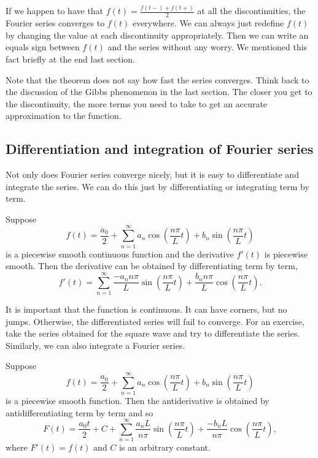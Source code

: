 If we happen to have that
$f(t) = \frac{f(t-)+f(t+)}{2}$ at all the discontinuities, the Fourier series
converges to $f(t)$ everywhere.  We can always just redefine $f(t)$
by changing the value at each discontinuity appropriately.  Then we can write
an equals sign between $f(t)$ and the series without any worry.
We mentioned this fact
briefly at the end last section.

Note that the theorem does not say how fast the series converges.
Think back to the discussion of the Gibbs phenomenon in the last section.
The closer you get to the discontinuity, the more terms you need to take
to get an accurate approximation to the function.

\subsection{Differentiation and integration of Fourier series}

Not only does Fourier series converge nicely, but it is easy to differentiate
and integrate the series.  We can do this just by differentiating or
integrating term by term.

\begin{theorem}
Suppose
\begin{equation*}
f(t) = \frac{a_0}{2} + \sum_{n=1}^\infty a_n \cos \left( \frac{n \pi}{L} t
\right)
+ b_n \sin \left( \frac{n \pi}{L} t \right)
\end{equation*}
is a piecewise smooth continuous function and the derivative $f'(t)$ is
piecewise smooth.  Then the derivative can be
obtained by differentiating term by term,
\begin{equation*}
f'(t) = \sum_{n=1}^\infty \frac{-a_n n \pi}{L} 
\sin \left( \frac{n \pi}{L} t \right)
+ \frac{b_n n \pi}{L} \cos \left( \frac{n \pi}{L} t \right) .
\end{equation*}
\end{theorem}

It is important that the function is continuous.  It can have corners, but no
jumps.  Otherwise, the differentiated series will fail to converge.  For an
exercise, take the series obtained for the square wave and try to
differentiate the series.  Similarly, we can also integrate a Fourier series.

\begin{theorem}
Suppose
\begin{equation*}
f(t) = \frac{a_0}{2} + \sum_{n=1}^\infty
a_n \cos \left( \frac{n \pi}{L} t \right)
+ b_n \sin \left( \frac{n \pi}{L} t \right)
\end{equation*}
is a piecewise smooth function.  Then the antiderivative is
obtained by antidifferentiating term by term and so
\begin{equation*}
F(t) = \frac{a_0 t}{2} + C + \sum_{n=1}^\infty
\frac{a_n L}{n \pi} \sin \left( \frac{n \pi}{L} t \right)
+ \frac{-b_n L}{n \pi}  \cos \left( \frac{n \pi}{L} t \right) ,
\end{equation*}
where $F'(t) = f(t)$ and $C$ is an arbitrary constant.
\end{theorem}

